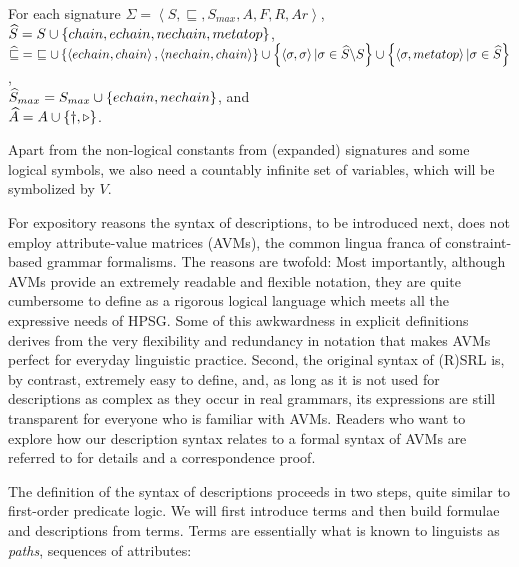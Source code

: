 \documentclass[output=paper
                ,modfonts
                ,nonflat
	        ,collection
	        ,collectionchapter
	        ,collectiontoclongg
 	        ,biblatex
                ,babelshorthands
                ,newtxmath
                ,draftmode
                ,colorlinks, citecolor=brown
]{./langsci/langscibook}
\begin{document}
{{\begin{mydef}\label{def-sig-chains}
For each signature $\Sigma=\left<S,\sqsubseteq,S_{max},A,F,R,Ar\right>$,\\
$\widehat{S}= S \cup \left\{\mit{chain, echain, nechain, metatop}\right\}$,\\
$\Aug\sqsubseteq=\ \sqsubseteq\cup\left\{\left<\mathit{echain},\mathit{chain}\right>,\left<\mathit{nechain},\mathit{chain}\right>\right\}\cup\left\{\left<\sigma,\sigma\right>|\sigma\in\Aug{S}\backslash S\right\}\cup\left\{\left<\sigma,\mathit{metatop}\right>|\sigma\in\Aug{S}\right\}$,\\
$\widehat{S}_{max}=S_{max}\cup\left\{\mit{echain},\mit{nechain}\right\}$, and\\
$\widehat{A}=A\cup\left\{\dagger,\triangleright\right\}$.
\end{mydef}

Apart from the non-logical constants from (expanded) signatures and
some logical symbols, we also need a countably infinite set of
variables, which will be symbolized by $V$.


For expository reasons the syntax of descriptions, to be introduced
next, does not employ attribute-value matrices (AVMs), the common
lingua franca of con\-straint-based grammar formalisms. The reasons are
twofold: Most importantly, although AVMs provide an extremely readable
and flexible notation, they are quite cumbersome to define as a
rigorous logical language which meets all the expressive needs of HPSG. Some
of this awkwardness in explicit definitions derives from the very
flexibility and redundancy in notation that makes AVMs perfect for
everyday linguistic practice. Second, the original syntax of (R)SRL
is, by contrast, extremely easy to define, and, as long as it is not used
for descriptions as complex as they occur in real grammars, its expressions are
still transparent for everyone who is familiar with AVMs. Readers who
want to explore how our description syntax relates to a formal syntax
of AVMs are referred to \cite{Richter2004a-u} for details and a
correspondence proof.

The definition of the syntax of descriptions proceeds in two steps,
quite similar to first-order predicate logic. We will first introduce
terms and then build formulae and descriptions from terms. Terms are essentially
what is known to linguists as \emph{paths}, sequences of attributes:

}}
\end{document}
